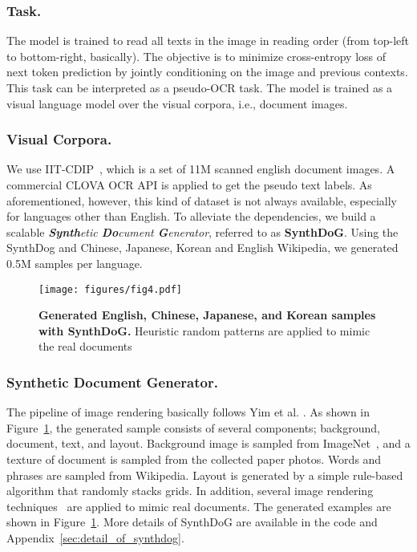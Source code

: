 \documentclass[runningheads]{llncs}
\begin{document}
\subsubsection{Task.}\label{sec:pretraining}
The model is trained to read all texts in the image in reading order (from top-left to bottom-right, basically).
The objective is to minimize cross-entropy loss of next token prediction by jointly conditioning on the image and previous contexts.
This task can be interpreted as a pseudo-OCR task.
The model is trained as a visual language model over the visual corpora, i.e., document images.

\subsubsection{Visual Corpora.}
We use IIT-CDIP~\cite{iitcdip}, which is a set of 11M scanned english document images. A commercial CLOVA OCR API is applied to get the pseudo text labels.
As aforementioned, however, this kind of dataset is not always available, especially for languages other than English.
To alleviate the dependencies, we build a scalable \textit{\textbf{Synth}etic \textbf{Do}cument \textbf{G}enerator}, referred to as \textbf{SynthDoG}.
Using the SynthDog and Chinese, Japanese, Korean and English Wikipedia, we generated 0.5M samples per language.


\begin{figure}[t!]
    \centering
     \texttt{[image: figures/fig4.pdf]}
    \caption{{\bf Generated English, Chinese, Japanese, and Korean samples with \textbf{SynthDoG}.} Heuristic random patterns are applied to mimic the real documents}\label{fig:synthdog}
\end{figure}

\subsubsection{Synthetic Document Generator.}
The pipeline of image rendering basically follows Yim et al. \cite{synthtiger}.
As shown in Figure~\ref{fig:synthdog}, the generated sample consists of several components; background, document, text, and layout.
Background image is sampled from ImageNet~\cite{deng2009imagenet}, and a texture of document is sampled from the collected paper photos.
Words and phrases are sampled from Wikipedia.
Layout is generated by a simple rule-based algorithm that randomly stacks grids.
In addition, several image rendering techniques~\cite{Gupta16,long2020unrealtext,synthtiger} are applied to mimic real documents.
The generated examples are shown in Figure~\ref{fig:synthdog}.
More details of SynthDoG are available in the code and Appendix~\ref{sec:detail_of_synthdog}. 
\end{document}
